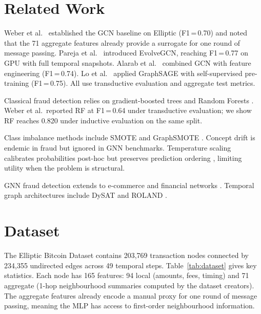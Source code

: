 \documentclass[journal,10pt,twoside]{IEEEtran}
\begin{document}
\section{Related Work}
\label{sec:related}

Weber et al.\ \cite{weber2019} established the GCN baseline on
Elliptic (F1\,=\,0.70) and noted that the 71 aggregate features
already provide a surrogate for one round of message passing. Pareja
et al.\ \cite{pareja2020evolvegcn} introduced EvolveGCN, reaching
F1\,=\,0.77 on GPU with full temporal snapshots. Alarab et al.\
\cite{alarab2020} combined GCN with feature engineering
(F1\,=\,0.74). Lo et al.\ \cite{lo2023} applied GraphSAGE with
self-supervised pre-training (F1\,=\,0.75). All use transductive
evaluation and aggregate test metrics.

Classical fraud detection relies on gradient-boosted trees
\cite{chen2016xgboost} and Random Forests \cite{breiman2001rf}.
Weber et al.\ reported RF at F1\,=\,0.64 under transductive
evaluation; we show RF reaches 0.820 under inductive evaluation
on the same split.

Class imbalance methods include SMOTE \cite{chawla2002smote} and
GraphSMOTE \cite{zhao2021graphsmote}. Concept drift
\cite{gama2014survey,lu2018drift} is endemic in fraud but ignored in
GNN benchmarks. Temperature scaling \cite{guo2017calibration}
calibrates probabilities post-hoc but preserves prediction ordering
\cite{platt1999calibration}, limiting utility when the problem is
structural.

GNN fraud detection extends to e-commerce \cite{wang2019semi} and
financial networks \cite{liu2018geniepath}. Temporal graph
architectures include DySAT \cite{sankar2020} and ROLAND
\cite{you2022roland}.

\section{Dataset}
\label{sec:dataset}

The Elliptic Bitcoin Dataset \cite{weber2019} contains 203,769
transaction nodes connected by 234,355 undirected edges across 49
temporal steps. Table~\ref{tab:dataset} gives key statistics. Each
node has 165 features: 94 local (amounts, fees, timing) and 71
aggregate (1-hop neighbourhood summaries computed by the dataset
creators). The aggregate features already encode a manual proxy for
one round of message passing, meaning the MLP has access to
first-order neighbourhood information.
\end{document}
